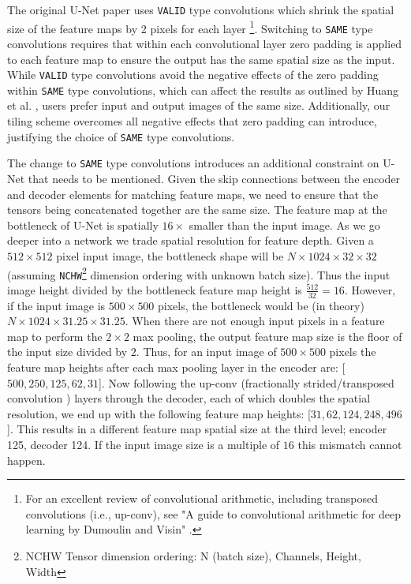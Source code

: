 \documentclass[runningheads]{llncs}
\begin{document}
The original U-Net paper uses \texttt{VALID} type convolutions which shrink the spatial size of the feature maps by 2 pixels for each layer \cite{Dumoulin2018}\footnote{For an excellent review of convolutional arithmetic, including transposed convolutions (i.e., up-conv), see "A guide to convolutional arithmetic for deep learning by Dumoulin and Visin" \cite{Dumoulin2018}.}. 
Switching to \texttt{SAME} type convolutions requires that within each convolutional layer zero padding is applied to each feature map to ensure the output has the same spatial size as the input. 
While \texttt{VALID} type convolutions avoid the negative effects of the zero padding within \texttt{SAME} type convolutions, which can affect the results as outlined by Huang et al. \cite{Huang2019a}, users prefer input and output images of the same size. Additionally, our tiling scheme overcomes all negative effects that zero padding can introduce, justifying the choice of \texttt{SAME} type convolutions. 

The change to \texttt{SAME} type convolutions introduces an additional constraint on U-Net that needs to be mentioned. Given the skip connections between the encoder and decoder elements for matching feature maps, we need to ensure that the tensors being concatenated together are the same size. The feature map at the bottleneck of U-Net is spatially $16 \times$ smaller than the input image. 
As we go deeper into a network we trade spatial resolution for feature depth. Given a $512 \times 512$ pixel input image, the bottleneck shape will be $N \times 1024 \times 32 \times 32$ (assuming \texttt{NCHW}\footnote{NCHW Tensor dimension ordering: N (batch size), Channels, Height, Width} dimension ordering with unknown batch size). Thus the input image height divided by the bottleneck feature map height is $\frac{512}{32} = 16$. However, if the input image is $500 \times 500$ pixels, the bottleneck would be (in theory) $N \times 1024 \times 31.25 \times 31.25$. When there are not enough input pixels in a feature map to perform the $2 \times 2$ max pooling, the output feature map size is the floor of the input size divided by $2$. 
Thus, for an input image of $500 \times 500$ pixels the feature map heights after each max pooling layer in the encoder are: [$500, 250, 125, 62, 31$]. Now following the up-conv (fractionally strided/transposed convolution \cite{Dumoulin2018}) layers through the decoder, each of which doubles the spatial resolution, we end up with the following feature map heights: [$31, 62, 124, 248, 496$]. This results in a different feature map spatial size at the third level; encoder 125, decoder 124. If the input image size is a multiple of $16$ this mismatch cannot happen. 
\end{document}
